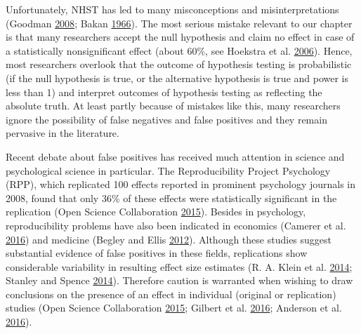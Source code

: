 \documentclass[a5paper]{book}
\begin{document}
Unfortunately, NHST has led to many misconceptions and
misinterpretations (Goodman
\protect\hyperlink{ref-doi:10.1053ux2fj.seminhematol.2008.04.003}{2008};
Bakan \protect\hyperlink{ref-doi:10.1037ux2fh0020412}{1966}). The most
serious mistake relevant to our chapter is that many researchers accept
the null hypothesis and claim no effect in case of a statistically
nonsignificant effect (about 60\%, see Hoekstra et al.
\protect\hyperlink{ref-doi:10.3758ux2fbf03213921}{2006}). Hence, most
researchers overlook that the outcome of hypothesis testing is
probabilistic (if the null hypothesis is true, or the alternative
hypothesis is true and power is less than 1) and interpret outcomes of
hypothesis testing as reflecting the absolute truth. At least partly
because of mistakes like this, many researchers ignore the possibility
of false negatives and false positives and they remain pervasive in the
literature.

Recent debate about false positives has received much attention in
science and psychological science in particular. The Reproducibility
Project Psychology (RPP), which replicated 100 effects reported in
prominent psychology journals in 2008, found that only 36\% of these
effects were statistically significant in the replication (Open Science
Collaboration
\protect\hyperlink{ref-doi:10.1126ux2fscience.aac4716}{2015}). Besides
in psychology, reproducibility problems have also been indicated in
economics (Camerer et al.
\protect\hyperlink{ref-doi:10.1126ux2fscience.aaf0918}{2016}) and
medicine (Begley and Ellis
\protect\hyperlink{ref-doi:10.1038ux2f483531a}{2012}). Although these
studies suggest substantial evidence of false positives in these fields,
replications show considerable variability in resulting effect size
estimates (R. A. Klein et al.
\protect\hyperlink{ref-doi:10.1027ux2f1864-9335ux2fa000178}{2014};
Stanley and Spence
\protect\hyperlink{ref-doi:10.1177ux2f1745691614528518}{2014}).
Therefore caution is warranted when wishing to draw conclusions on the
presence of an effect in individual (original or replication) studies
(Open Science Collaboration
\protect\hyperlink{ref-doi:10.1126ux2fscience.aac4716}{2015}; Gilbert et
al. \protect\hyperlink{ref-doi:10.1126ux2fscience.aad7243}{2016};
Anderson et al.
\protect\hyperlink{ref-doi:10.1126ux2fscience.aad9163}{2016}).
\end{document}
